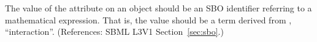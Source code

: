The value of the  attribute on an \Event object should be
an SBO identifier referring to a mathematical expression.  That is, the
value should be a term derived from \sbointeractionID,
``interaction''.  (References: SBML L3V1 Section~\ref{sec:sbo}.)
